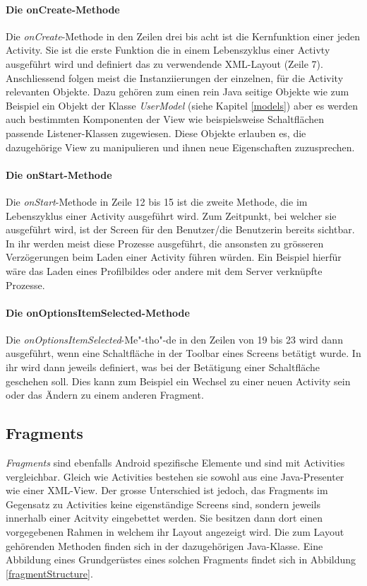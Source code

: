 \documentclass[../main.tex]{subfiles}
\begin{document}
	\paragraph{Die onCreate-Methode}
	Die \emph{onCreate}-Methode in den Zeilen drei bis acht ist die Kernfunktion einer jeden Activity. Sie ist die erste Funktion die in einem Lebenszyklus einer Activty ausgeführt wird und definiert das zu verwendende XML-Layout (Zeile 7). Anschliessend folgen meist die Instanziierungen der einzelnen, für die Activity relevanten Objekte. Dazu gehören zum einen rein Java seitige Objekte wie zum Beispiel ein Objekt der Klasse \emph{UserModel} (siehe Kapitel \ref{models}) aber es werden auch bestimmten Komponenten der View wie beispielsweise Schaltflächen passende Listener-Klassen zugewiesen. Diese Objekte erlauben es, die dazugehörige View zu manipulieren und ihnen neue Eigenschaften zuzusprechen.

	\paragraph{Die onStart-Methode}
	Die \emph{onStart}-Methode in Zeile 12 bis 15 ist die zweite Methode, die im Lebenszyklus einer Activity ausgeführt wird. Zum Zeitpunkt, bei welcher sie ausgeführt wird, ist der Screen für den Benutzer/die Benutzerin bereits sichtbar. In ihr werden meist diese Prozesse ausgeführt, die ansonsten zu grösseren Verzögerungen beim Laden einer Activity führen würden. Ein Beispiel hierfür wäre das Laden eines Profilbildes oder andere mit dem Server verknüpfte Prozesse.
	
	\paragraph{Die onOptionsItemSelected-Methode} 
	\sloppy
	Die \emph{onOptionsItemSelected}-Me"-tho"-de in den Zeilen von 19 bis 23 wird dann ausgeführt, wenn eine Schaltfläche in der Toolbar eines Screens betätigt wurde. In ihr wird dann jeweils definiert, was bei der Betätigung einer Schaltfläche geschehen soll. Dies kann zum Beispiel ein Wechsel zu einer neuen Activity sein oder das Ändern zu einem anderen Fragment.
	\fussy
	
	\subsection{Fragments}
	\emph{Fragments} sind ebenfalls Android spezifische Elemente und sind mit Activities vergleichbar. Gleich wie Activities bestehen sie sowohl aus eine Java-Presenter wie einer XML-View. Der grosse Unterschied ist jedoch, das Fragments im Gegensatz zu Activities keine eigenständige Screens sind, sondern jeweils innerhalb einer Acitvity eingebettet werden. Sie besitzen dann dort einen vorgegebenen Rahmen in welchem ihr Layout angezeigt wird. Die zum Layout gehörenden Methoden finden sich in der dazugehörigen Java-Klasse. Eine Abbildung eines Grundgerüstes eines solchen Fragments findet sich in Abbildung \ref{fragmentStructure}.
	
\end{document}
